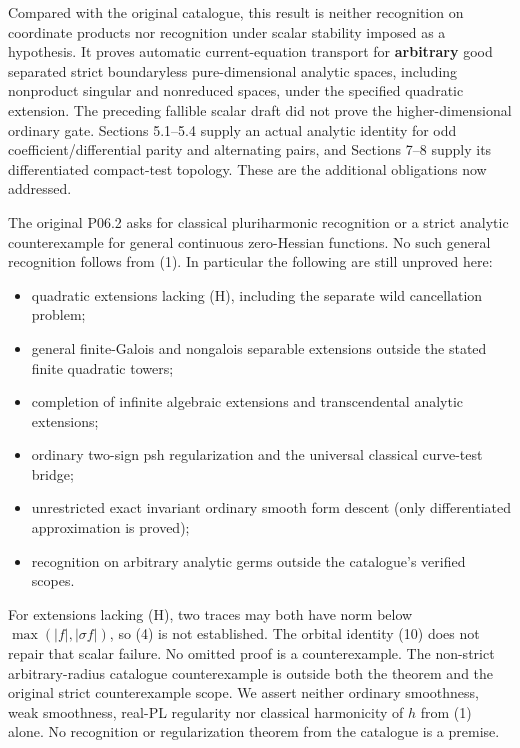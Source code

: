 \documentclass[
  11pt,
]{article}
\providecommand{\tightlist}{%
  \setlength{\itemsep}{0pt}\setlength{\parskip}{0pt}}
\begin{document}
Compared with the original catalogue, this result is neither recognition
on coordinate products nor recognition under scalar stability imposed as
a hypothesis. It proves automatic current-equation transport for
\textbf{arbitrary} good separated strict boundaryless pure-dimensional
analytic spaces, including nonproduct singular and nonreduced spaces,
under the specified quadratic extension. The preceding fallible scalar
draft did not prove the higher-dimensional ordinary gate. Sections
5.1--5.4 supply an actual analytic identity for odd
coefficient/differential parity and alternating pairs, and Sections 7--8
supply its differentiated compact-test topology. These are the
additional obligations now addressed.

The original P06.2 asks for classical pluriharmonic recognition or a
strict analytic counterexample for general continuous zero-Hessian
functions. No such general recognition follows from (1). In particular
the following are still unproved here:

\begin{itemize}
\tightlist
\item
  quadratic extensions lacking (H), including the separate wild
  cancellation problem;
\item
  general finite-Galois and nongalois separable extensions outside the
  stated finite quadratic towers;
\item
  completion of infinite algebraic extensions and transcendental
  analytic extensions;
\item
  ordinary two-sign psh regularization and the universal classical
  curve-test bridge;
\item
  unrestricted exact invariant ordinary smooth form descent (only
  differentiated approximation is proved);
\item
  recognition on arbitrary analytic germs outside the catalogue's
  verified scopes.
\end{itemize}

For extensions lacking (H), two traces may both have norm below
\(\max(|f|,|\sigma f|)\), so (4) is not established. The orbital
identity (10) does not repair that scalar failure. No omitted proof is a
counterexample. The non-strict arbitrary-radius catalogue counterexample
is outside both the theorem and the original strict counterexample
scope. We assert neither ordinary smoothness, weak smoothness, real-PL
regularity nor classical harmonicity of \(h\) from (1) alone. No
recognition or regularization theorem from the catalogue is a premise.
\end{document}
